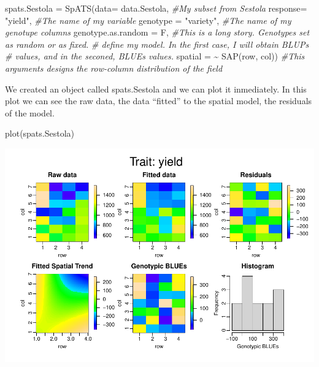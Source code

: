 \documentclass[
]{book}
\newenvironment{Shaded}{\begin{snugshade}}{\end{snugshade}}
\newcommand{\AttributeTok}[1]{\textcolor[rgb]{0.77,0.63,0.00}{#1}}
\newcommand{\CommentTok}[1]{\textcolor[rgb]{0.56,0.35,0.01}{\textit{#1}}}
\newcommand{\FunctionTok}[1]{\textcolor[rgb]{0.00,0.00,0.00}{#1}}
\newcommand{\NormalTok}[1]{#1}
\newcommand{\OtherTok}[1]{\textcolor[rgb]{0.56,0.35,0.01}{#1}}
\newcommand{\SpecialCharTok}[1]{\textcolor[rgb]{0.00,0.00,0.00}{#1}}
\newcommand{\StringTok}[1]{\textcolor[rgb]{0.31,0.60,0.02}{#1}}
\begin{document}
\begin{Shaded}
\begin{Highlighting}[]
\NormalTok{spats.Sestola  }\OtherTok{=}    \FunctionTok{SpATS}\NormalTok{(}\AttributeTok{data=}\NormalTok{      data.Sestola,    }\CommentTok{\#My subset from Sestola  }
                          \AttributeTok{response=} \StringTok{"yield"}\NormalTok{,          }\CommentTok{\#The name of my variable}
                          \AttributeTok{genotype =} \StringTok{"variety"}\NormalTok{,       }\CommentTok{\#The name of my genotupe columns}
                          \AttributeTok{genotype.as.random =}\NormalTok{ F,     }\CommentTok{\#This is a long story. Genotypes set as random or as fixed.}
                                                      \CommentTok{\# define my model. In the first case, I will obtain BLUPs }
                                                      \CommentTok{\# values, and in the seconed, BLUEs values.}
                          \AttributeTok{spatial =} \SpecialCharTok{\textasciitilde{}} \FunctionTok{SAP}\NormalTok{(row, col))  }\CommentTok{\#This arguments designs the row{-}column distribution of the field}
\end{Highlighting}
\end{Shaded}

We created an object called spats.Sestola and we can plot it inmediately. In this plot we can see the raw data, the data ``fitted'' to the spatial model, the residuals of the model.

\begin{Shaded}
\begin{Highlighting}[]
\FunctionTok{plot}\NormalTok{(spats.Sestola)}
\end{Highlighting}
\end{Shaded}

\includegraphics{PPB-Toolkit-for-R-and-R-Studio_files/figure-latex/unnamed-chunk-112-1.pdf}
\end{document}
